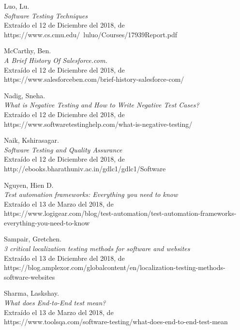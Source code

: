 \begin{thebibliography}{99}
 Luo, Lu.\\ %
\emph{Software Testing Techniques}\\
Extraído el 12 de Diciembre del 2018, de\\
https://www.cs.cmu.edu/~luluo/Courses/17939Report.pdf

 McCarthy, Ben.\\ %
\emph{A Brief History Of Salesforce.com.}\\
Extraído el 12 de Diciembre del 2018, de\\
https://www.salesforceben.com/brief-history-salesforce-com/

 Nadig, Sneha.\\ %
\emph{What is Negative Testing and How to Write Negative Test Cases?}\\
Extraído el 12 de Diciembre del 2018, de\\
https://www.softwaretestinghelp.com/what-is-negative-testing/

 Naik, Kshirasagar.\\ %
\emph{Software Testing and Quality Assurance}\\
Extraído el 12 de Diciembre del 2018, de\\
http://ebooks.bharathuniv.ac.in/gdlc1/gdlc1/Software%

 Nguyen, Hien D.\\
\emph{Test automation frameworks: Everything you need to know}\\
Extraído el 13 de Marzo del 2018, de\\
https://www.logigear.com/blog/test-automation/test-automation-frameworks-everything-you-need-to-know

 Sampair, Gretchen.\\
\emph{3 critical localization testing methods for software and websites}\\
Extraído el 13 de Diciembre del 2018, de\\
https://blog.amplexor.com/globalcontent/en/localization-testing-methods-software-websites

 Sharma, Laskshay.\\
\emph{What does End-to-End test mean?}\\
Extraído el 13 de Marzo del 2018, de\\
https://www.toolsqa.com/software-testing/what-does-end-to-end-test-mean


\end{thebibliography}
